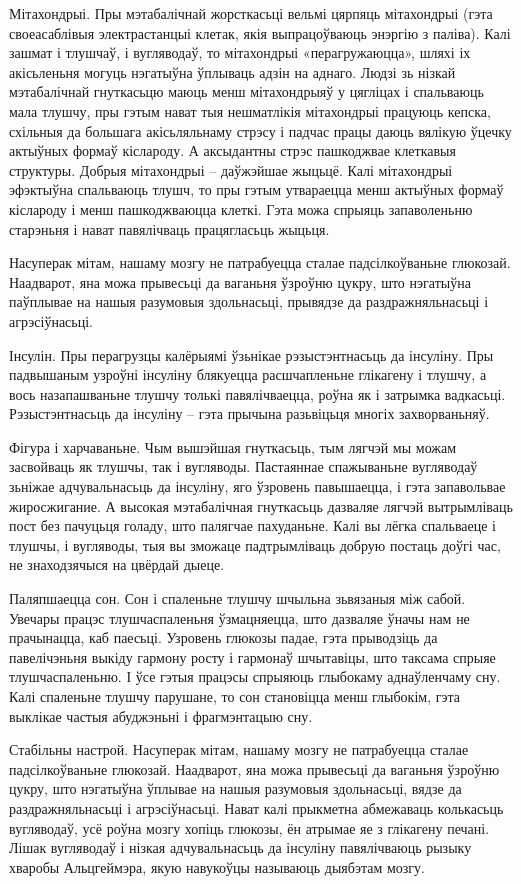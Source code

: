 Мітахондрыі.
Пры мэтабалічнай жорсткасьці вельмі цярпяць мітахондрыі (гэта своеасаблівыя электрастанцыі клетак, якія выпрацоўваюць энэргію з паліва). Калі зашмат і тлушчаў, і вугляводаў, то мітахондрыі «перагружаюцца», шляхі іх акісьленьня могуць нэгатыўна ўплываць адзін на аднаго. Людзі зь нізкай мэтабалічнай гнуткасьцю маюць менш мітахондрыяў у цягліцах і спальваюць мала тлушчу, пры гэтым нават тыя нешматлікія мітахондрыі працуюць кепска, схільныя да большага акісьляльнаму стрэсу і падчас працы даюць вялікую ўцечку актыўных формаў кіслароду. А аксыдантны стрэс пашкоджвае клеткавыя структуры. Добрыя мітахондрыі – даўжэйшае жыцьцё. Калі мітахондрыі эфэктыўна спальваюць тлушч, то пры гэтым утвараецца менш актыўных формаў кіслароду і менш пашкоджваюцца клеткі. Гэта можа спрыяць запаволеньню старэньня і нават павялічваць працягласьць жыцьця.

Насуперак мітам, нашаму мозгу не патрабуецца сталае падсілкоўваньне глюкозай. Наадварот, яна можа прывесьці да ваганьня ўзроўню цукру, што нэгатыўна паўплывае на нашыя разумовыя здольнасьці, прывядзе да раздражняльнасьці і агрэсіўнасьці.

Інсулін.
Пры перагрузцы калёрыямі ўзьнікае рэзыстэнтнасьць да інсуліну. Пры падвышаным узроўні інсуліну блякуецца расшчапленьне глікагену і тлушчу, а вось назапашваньне тлушчу толькі павялічваецца, роўна як і затрымка вадкасьці. Рэзыстэнтнасьць да інсуліну – гэта прычына разьвіцьця многіх захворваньняў.

Фігура і харчаваньне.
Чым вышэйшая гнуткасьць, тым лягчэй мы можам засвойваць як тлушчы, так і вугляводы. Пастаяннае спажываньне вугляводаў зьніжае адчувальнасьць да інсуліну, яго ўзровень павышаецца, і гэта запавольвае жиросжигание. А высокая мэтабалічная гнуткасьць дазваляе лягчэй вытрымліваць пост без пачуцьця голаду, што палягчае пахуданьне. Калі вы лёгка спальваеце і тлушчы, і вугляводы, тыя вы зможаце падтрымліваць добрую постаць доўгі час, не знаходзячыся на цвёрдай дыеце.

Паляпшаецца сон.
Сон і спаленьне тлушчу шчыльна зьвязаныя між сабой. Увечары працэс тлушчаспаленьня ўзмацняецца, што дазваляе ўначы нам не прачынацца, каб паесьці. Узровень глюкозы падае, гэта прыводзіць да павелічэньня выкіду гармону росту і гармонаў шчытавіцы, што таксама спрыяе тлушчаспаленьню. І ўсе гэтыя працэсы спрыяюць глыбокаму аднаўленчаму сну. Калі спаленьне тлушчу парушане, то сон становіцца менш глыбокім, гэта выклікае частыя абуджэньні і фрагмэнтацыю сну.

Стабільны настрой.
Насуперак мітам, нашаму мозгу не патрабуецца сталае падсілкоўваньне глюкозай. Наадварот, яна можа прывесьці да ваганьня ўзроўню цукру, што нэгатыўна ўплывае на нашыя разумовыя здольнасьці, вядзе да раздражняльнасьці і агрэсіўнасьці. Нават калі прыкметна абмежаваць колькасьць вугляводаў, усё роўна мозгу хопіць глюкозы, ён атрымае яе з глікагену печані. Лішак вугляводаў і нізкая адчувальнасьць да інсуліну павялічваюць рызыку хваробы Альцгеймэра, якую навукоўцы называюць дыябэтам мозгу.

